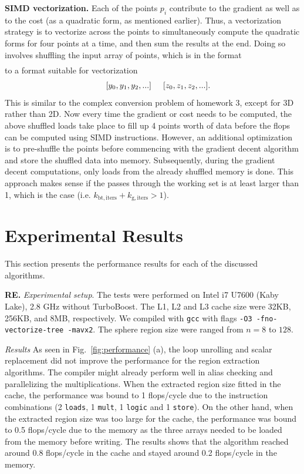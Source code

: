 \documentclass[letterpaper]{article}
\newcommand{\mypar}[1]{{\bf #1.}}
\begin{document}
\mypar{SIMD vectorization}
Each of the points $p_i$ contribute to the gradient as well as to the cost (as a quadratic form, as mentioned earlier). Thus, a vectorization strategy is to vectorize across the points to simultaneously compute the quadratic forms for four points at a time, and then sum the results at the end. Doing so involves shuffling the input array of points, which is in the format 
\begin{align*}
  [x_0, y_0, z_0, x_1, y_1, z_1, x_2, y_2, ...]
\end{align*}
to a format suitable for vectorization
\begin{align*}
  [x_0, x_1, x_2, ...] \hspace{5mm} [y_0, y_1, y_2, ...] \hspace{5mm} [z_0, z_1, z_2, ...].
\end{align*}
This is similar to the complex conversion problem of homework 3, except for 3D rather than 2D. Now every time the gradient or cost needs to be computed, the above shuffled loads take place to fill up 4 points worth of data before the flops can be computed using SIMD instructions. However, an additional optimization is to pre-shuffle the points before commencing with the gradient decent algorithm and store the shuffled data into memory. Subsequently, during the gradient decent computations, only loads from the already shuffled memory is done. This approach makes sense if the passes through the working set is at least larger than 1, which is the case (i.e. $k_\mathrm{bt,iters}+k_\mathrm{g,iters} > 1$). 

\section{Experimental Results}\label{sec:exp}
This section presents the performance results for each of the discussed algorithms.

\mypar{RE} \textit{Experimental setup}. The tests were performed on Intel i7 U7600 (Kaby Lake), 2.8 GHz without TurboBoost. The L1, L2 and L3 cache size were 32KB, 256KB, and 8MB, respectively. We compiled with \texttt{gcc} with flags \texttt{-O3 -fno-vectorize-tree -mavx2}. The sphere region size were ranged from $n=8$ to $128$.

\textit{Results} As seen in Fig.~\ref{fig:performance} (a), the loop unrolling and scalar replacement did not improve the performance for the region extraction algorithms. The compiler might already perform well in alias checking and parallelizing the multiplications. When the extracted region size fitted in the cache, the performance was bound to 1 flops/cycle due to the instruction combinations (2 {\tt loads}, 1 {\tt mult}, 1 {\tt logic} and 1 {\tt store}). On the other hand, when the extracted region size was too large for the cache, the performance was bound to 0.5 flops/cycle due to the memory as the three arrays needed to be loaded from the memory before writing. The results shows that the algorithm reached around 0.8 flops/cycle in the cache and stayed around 0.2 flops/cycle in the memory.   
\end{document}
